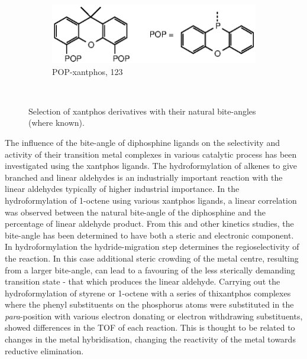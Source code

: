 \begin{figure}[htbp]
~
\begin{subfigure}[b]{0.6\textwidth}
	\centering
	\includegraphics{../Figures/Xantphosderivatives/POP-xantphos.eps}
	\caption{POP-xantphos, 123\degrees}
	\label{POP-xantphos}
\end{subfigure}
\\
\caption[Selection of xantphos derivatives]{Selection of xantphos derivatives with their natural bite-angles (where known).\cite{Dierkes1999, Veen1999, Veen2000, Veen2000b}}
\label{xantphosderivatives}
\end{figure}

The influence of the bite-angle of diphosphine ligands on the selectivity and activity of their transition metal complexes in various catalytic process has been investigated using the xantphos ligands.  The hydroformylation of alkenes to give branched and linear aldehydes is an industrially important reaction with the linear aldehydes typically of higher industrial importance.\cite{Leeuwenbook2000}  In the hydroformylation of 1-octene using various xantphos ligands, a linear correlation was observed between the natural bite-angle of the diphosphine and the percentage of linear aldehyde product.\cite{Kranenburg1995}  From this and other kinetics studies, the bite-angle has been determined to have both a steric and electronic component.\cite{Veen1998, Leeuwen2000}  In hydroformylation the hydride-migration step determines the regioselectivity of the reaction.  In this case additional steric crowding of the metal centre, resulting from a larger bite-angle, can lead to a favouring of the less sterically demanding transition state - that which produces the linear aldehyde.\cite{Freixa2003}  Carrying out the hydroformylation of styrene or 1-octene with a series of thixantphos complexes where the phenyl substituents on the phosphorus atoms were substituted in the \emph{para}-position with various electron donating or electron withdrawing substituents, showed differences in the \gls{TOF} of each reaction.\cite{Veen1998}  This is thought to be related to changes in the metal hybridisation, changing the reactivity of the metal towards reductive elimination.\cite{Slot2002, Freixa2003}

